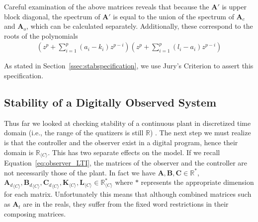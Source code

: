 \documentclass[sigconf]{llncs}
\newcommand{\mat}[1]{\boldsymbol{#1}}
\begin{document}
Careful examination of the above matrices reveals that because the $\mat{A}'$ is
upper block diagonal, the spectrum of $\mat{A}'$ is equal to the union of
the spectrum of $\mat{A}_{c}$ and $\mat{A}_{o}$, which can be calculated
separately.  Additionally, these correspond to the roots of the polynomials
%
\begin{align*}
\left(z^p+\sum_{i=1}^p{(a_i-k_i)z^{p-i}}\right) \left(z^p+\sum_{i=1}^p{(l_i-a_i)z^{p-i}}\right)
\end{align*}

As stated in Section~\ref{ssec:stabspecification}, we use Jury's Criterion
to assert this specification. 

\subsection{Stability of a Digitally Observed System}\label{sec:cof_fwl_stability}

Thus far we looked at checking stability
of a continuous plant in discretized time domain (i.e., the range of the quatizers is still
$\mathbb{R}$) .  The next step we must realize is that the controller and the
observer exist in a digital program, hence their domain is
$\mathbb{R}_{\langle C \rangle}$.  This has two separate effects on the
model.  If we recall Equation~\eqref{eq:observer_LTI}, the matrices of the observer
and the controller are not necessarily those of the plant.  In fact we have
$\mat{A},\mat{B},\mat{C} \in \mathbb{R}^*$, ${\mat{A}_d}_{\langle C
\rangle},{\mat{B}_d}_{\langle C \rangle},{\mat{C}_d}_{\langle C \rangle},
\mat{K}_{\langle C \rangle}, \mat{L}_{\langle C \rangle} \in
\mathbb{R}_{\langle C \rangle}^*$ where $*$ represents the appropriate
dimension for each matrix.  Unfortunately this means that although combined
matrices such as $\mat{A}_t$ are in the reals, they suffer from the fixed
word restrictions in their composing matrices.
\end{document}
